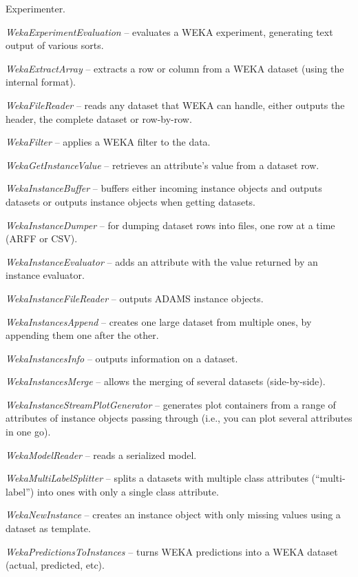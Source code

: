 \begin{tight_itemize}
	Experimenter.
	\item \textit{WekaExperimentEvaluation} -- evaluates a WEKA experiment,
	generating text output of various sorts.
	\item \textit{WekaExtractArray} -- extracts a row or column from a WEKA
	dataset (using the internal format).
	\item \textit{WekaFileReader} -- reads any dataset that WEKA can handle, 
	either outputs the header, the complete dataset or row-by-row.
	\item \textit{WekaFilter} -- applies a WEKA filter to the data.
	\item \textit{WekaGetInstanceValue} -- retrieves an attribute's value from
	a dataset row.
	\item \textit{WekaInstanceBuffer} -- buffers either incoming instance 
	objects and outputs datasets or outputs instance objects when getting
	datasets.
	\item \textit{WekaInstanceDumper} -- for dumping dataset rows into files,
	one row at a time (ARFF or CSV).
	\item \textit{WekaInstanceEvaluator} -- adds an attribute with the value
	returned by an instance evaluator.
	\item \textit{WekaInstanceFileReader} -- outputs ADAMS instance objects.
	\item \textit{WekaInstancesAppend} -- creates one large dataset from 
	multiple ones, by appending them one after the other.
	\item \textit{WekaInstancesInfo} -- outputs information on a dataset.
	\item \textit{WekaInstancesMerge} -- allows the merging of several datasets 
	(side-by-side).
	\item \textit{WekaInstanceStreamPlotGenerator} -- generates plot containers
	from a range of attributes of instance objects passing through (i.e., you 
	can plot several attributes in one go).
	\item \textit{WekaModelReader} -- reads a serialized model.
	\item \textit{WekaMultiLabelSplitter} -- splits a datasets with multiple
	class attributes (``multi-label'') into ones with only a single class 
	attribute.
	\item \textit{WekaNewInstance} -- creates an instance object with only 
	missing values using a dataset as template.
	\item \textit{WekaPredictionsToInstances} -- turns WEKA predictions into
	a WEKA dataset (actual, predicted, etc).

\end{tight_itemize}
